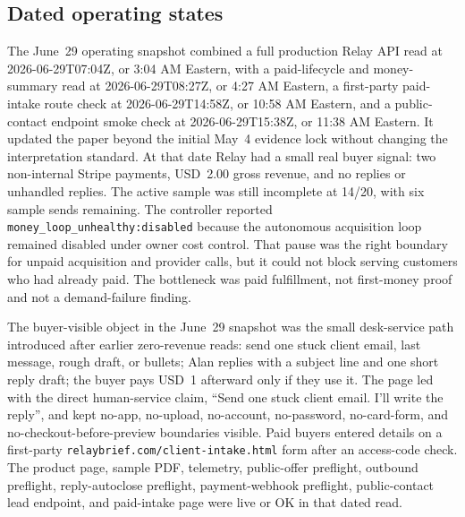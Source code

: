 \documentclass[12pt,letterpaper]{article}
\begin{document}
\subsection{Dated operating states}

The June~29 operating snapshot combined a full production Relay API read at 2026-06-29T07:04Z, or 3:04 AM Eastern, with a paid-lifecycle and money-summary read at 2026-06-29T08:27Z, or 4:27 AM Eastern, a first-party paid-intake route check at 2026-06-29T14:58Z, or 10:58 AM Eastern, and a public-contact endpoint smoke check at 2026-06-29T15:38Z, or 11:38 AM Eastern. It updated the paper beyond the initial May~4 evidence lock without changing the interpretation standard. At that date Relay had a small real buyer signal: two non-internal Stripe payments, USD~2.00 gross revenue, and no replies or unhandled replies. The active sample was still incomplete at 14/20, with six sample sends remaining. The controller reported \texttt{money\_loop\_unhealthy:disabled} because the autonomous acquisition loop remained disabled under owner cost control. That pause was the right boundary for unpaid acquisition and provider calls, but it could not block serving customers who had already paid. The bottleneck was paid fulfillment, not first-money proof and not a demand-failure finding.

The buyer-visible object in the June~29 snapshot was the small desk-service path introduced after earlier zero-revenue reads: send one stuck client email, last message, rough draft, or bullets; Alan replies with a subject line and one short reply draft; the buyer pays USD~1 afterward only if they use it. The page led with the direct human-service claim, \enquote{Send one stuck client email. I'll write the reply}, and kept no-app, no-upload, no-account, no-password, no-card-form, and no-checkout-before-preview boundaries visible. Paid buyers entered details on a first-party \texttt{relaybrief.com/client-intake.html} form after an access-code check. The product page, sample PDF, telemetry, public-offer preflight, outbound preflight, reply-autoclose preflight, payment-webhook preflight, public-contact lead endpoint, and paid-intake page were live or OK in that dated read.
\end{document}
